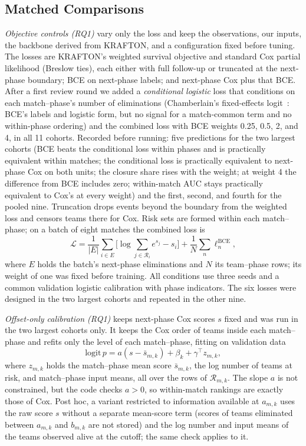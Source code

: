 \documentclass[sigconf,anonymous]{acmart}
\begin{document}
\subsection{Matched Comparisons}
\label{sec:method:decomposition}
\emph{Objective controls (RQ1)} vary only the loss and keep the observations, our inputs, the backbone derived from KRAFTON, and a configuration fixed before tuning. The losses are KRAFTON's weighted survival objective and standard Cox partial likelihood (Breslow ties), each either with full follow-up or truncated at the next-phase boundary; BCE on next-phase labels; and next-phase Cox plus that BCE. After a first review round we added a \emph{conditional logistic} loss that conditions on each match--phase's number of eliminations (Chamberlain's fixed-effects logit~\cite{Chamberlain80}: BCE's labels and logistic form, but no signal for a match-common term and no within-phase ordering) and the combined loss with BCE weights 0.25, 0.5, 2, and 4, in all 11 cohorts. Recorded before running: five predictions for the two largest cohorts (BCE beats the conditional loss within phases and is practically equivalent within matches; the conditional loss is practically equivalent to next-phase Cox on both units; the closure share rises with the weight; at weight 4 the difference from BCE includes zero; within-match AUC stays practically equivalent to Cox's at every weight) and the first, second, and fourth for the pooled nine. Truncation drops events beyond the boundary from the weighted loss and censors teams there for Cox. Risk sets are formed within each match--phase; on a batch of eight matches the combined loss is
\begin{equation}
\mathcal{L}=\frac{1}{|E|}\sum_{i\in E}\Big[\log\sum_{j\in\mathcal{R}_i}e^{s_j}-s_i\Big]+\frac{1}{N}\sum_{n}\ell^{\mathrm{BCE}}_n,
\label{eq:combined}
\end{equation}
where $E$ holds the batch's next-phase eliminations and $N$ its team--phase rows; its weight of one was fixed before training. All conditions use three seeds and a common validation logistic calibration with phase indicators. The six losses were designed in the two largest cohorts and repeated in the other nine.

\emph{Offset-only calibration (RQ1)} keeps next-phase Cox scores $s$ fixed and was run in the two largest cohorts only. It keeps the Cox order of teams inside each match--phase and refits only the level of each match--phase, fitting on validation data
\begin{equation}
\mathrm{logit}\,p=a(s-\bar s_{m,k})+\beta_k+\gamma^{\top}z_{m,k},
\label{eq:offset}
\end{equation}
where $z_{m,k}$ holds the match--phase mean score $\bar s_{m,k}$, the log number of teams at risk, and match--phase input means, all over the rows of $\mathcal{R}_{m,k}$. The slope $a$ is not constrained, but the code checks $a>0$, so within-match rankings are exactly those of Cox. Post hoc, a variant restricted to information available at $a_{m,k}$ uses the raw score $s$ without a separate mean-score term (scores of teams eliminated between $a_{m,k}$ and $b_{m,k}$ are not stored) and the log number and input means of the teams observed alive at the cutoff; the same check applies to it.
\end{document}
